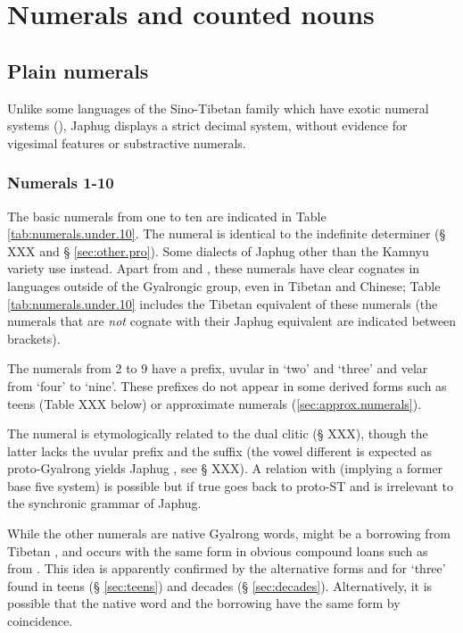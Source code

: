 \chapter{Numerals and counted nouns}

\section{Plain numerals} \label{sec:plain.numerals}
Unlike some languages of the Sino-Tibetan family which have exotic numeral systems (\citealt{mazaudon02nombre}), Japhug displays a strict decimal system, without evidence for vigesimal features or substractive numerals.


\subsection{Numerals 1-10}  \label{sec:one.to.ten}
The basic numerals from one to ten are indicated in Table \ref{tab:numerals.under.10}. The numeral  is identical to the indefinite determiner (§ XXX and § \ref{sec:other.pro}). Some dialects of Japhug other than the Kamnyu variety use  instead. Apart from  and , these numerals have clear cognates in languages outside of the Gyalrongic group, even in Tibetan and Chinese; Table \ref{tab:numerals.under.10} includes the Tibetan equivalent of these numerals (the numerals that are \textit{not} cognate with their Japhug equivalent are indicated between brackets).

The numerals from 2 to 9 have a prefix, uvular  in `two' and `three' and velar  from `four' to `nine'. These prefixes do not appear in some derived forms such as teens (Table XXX below) or approximate numerals (\ref{sec:approx.numerals}).

The numeral  is etymologically related to the dual clitic  (§ XXX), though the latter lacks the uvular prefix and the  suffix (the vowel different is expected as proto-Gyalrong  yields Japhug , see § XXX). A relation with  (implying a former base five system) is possible but if true goes back to proto-ST and is irrelevant to the synchronic grammar of Japhug.

While the other numerals are native Gyalrong words,  might be a borrowing from Tibetan , and occurs with the same form in obvious compound loans  such as  from . This idea is apparently confirmed by the alternative forms  and  for `three' found in teens (§ \ref{sec:teens}) and decades  (§ \ref{sec:decades}). Alternatively, it is possible that the native word and the borrowing have the same form by coincidence.


